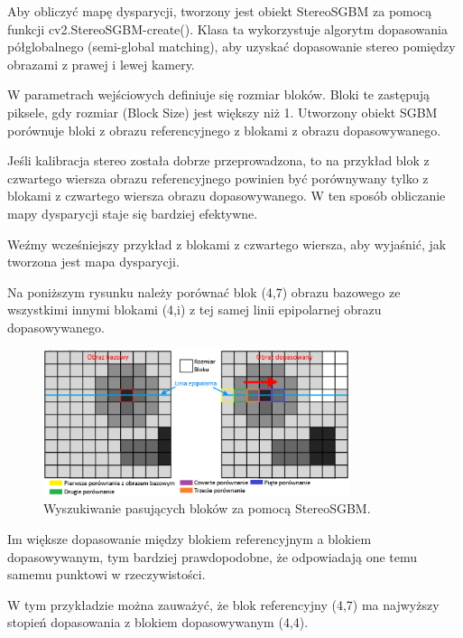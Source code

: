 \documentclass[magisterska]{pracadypl}
\begin{document}
Aby obliczyć mapę dysparycji, tworzony jest obiekt StereoSGBM za pomocą funkcji cv2.StereoSGBM-create(). Klasa ta wykorzystuje algorytm dopasowania półglobalnego (semi-global matching)\cite{semi-global}, aby uzyskać dopasowanie stereo pomiędzy obrazami z prawej i lewej kamery.

W parametrach wejściowych definiuje się rozmiar bloków. Bloki te zastępują piksele, gdy rozmiar (Block Size) jest większy niż 1. Utworzony obiekt SGBM porównuje bloki z obrazu referencyjnego z blokami z obrazu dopasowywanego.

Jeśli kalibracja stereo została dobrze przeprowadzona, to na przykład blok z czwartego wiersza obrazu referencyjnego powinien być porównywany tylko z blokami z czwartego wiersza obrazu dopasowywanego. W ten sposób obliczanie mapy dysparycji staje się bardziej efektywne.

Weźmy wcześniejszy przykład z blokami z czwartego wiersza, aby wyjaśnić, jak tworzona jest mapa dysparycji.

Na poniższym rysunku należy porównać blok (4,7) obrazu bazowego ze wszystkimi innymi blokami (4,i) z tej samej linii epipolarnej obrazu dopasowywanego.

\begin{figure}[H]  %
    \centering  %
    \includegraphics[width=0.8\textwidth]{images/dopracy1.png}  %
    \captionsetup{font=footnotesize}
    \caption[Wyszukiwanie pasujących bloków za pomocą StereoSGBM. Opracowanie własne. ]{Wyszukiwanie pasujących bloków za pomocą StereoSGBM.}
\end{figure}

Im większe dopasowanie między blokiem referencyjnym a blokiem dopasowywanym, tym bardziej prawdopodobne, że odpowiadają one temu samemu punktowi w rzeczywistości.

W tym przykładzie można zauważyć, że blok referencyjny (4,7) ma najwyższy stopień dopasowania z blokiem dopasowywanym (4,4).
\end{document}
